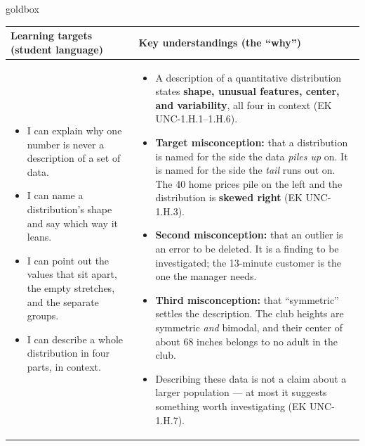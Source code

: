 \documentclass[10pt]{article}
\begin{document}
\renewcommand{\arraystretch}{1.4}
\boxguard
\begin{skillbox}{goldbox}
\begin{tabularx}{\linewidth}{@{}X|X@{}}
\textbf{Learning targets (student language)} & \textbf{Key understandings (the ``why'')} \\[2pt]
\hline
\vspace{-6pt}
\begin{itemize}[leftmargin=1.1em, nosep, after=\vspace{2pt}]
  \item I can explain why one number is never a description of a set of data.
  \item I can name a distribution's shape and say which way it leans.
  \item I can point out the values that sit apart, the empty stretches, and the separate groups.
  \item I can describe a whole distribution in four parts, in context.
\end{itemize}
&
\vspace{-6pt}
\begin{itemize}[leftmargin=1.1em, nosep, after=\vspace{2pt}]
  \item A description of a quantitative distribution states \textbf{shape, unusual features,
        center, and variability}, all four in context (EK UNC-1.H.1--1.H.6).
  \item \textbf{Target misconception:} that a distribution is named for the side the data
        \emph{piles up} on. It is named for the side the \emph{tail} runs out on. The 40 home
        prices pile on the left and the distribution is \textbf{skewed right}
        (EK UNC-1.H.3).
  \item \textbf{Second misconception:} that an outlier is an error to be deleted. It is a
        finding to be investigated; the 13-minute customer is the one the manager needs.
  \item \textbf{Third misconception:} that ``symmetric'' settles the description. The club
        heights are symmetric \emph{and} bimodal, and their center of about 68 inches belongs
        to no adult in the club.
  \item Describing these data is not a claim about a larger population --- at most it suggests
        something worth investigating (EK UNC-1.H.7).
\end{itemize}
\end{tabularx}
\end{skillbox}
\end{document}
